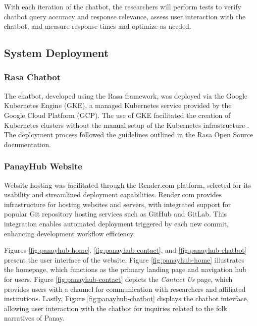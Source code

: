     With each iteration of the chatbot, the researchers will perform tests to verify chatbot query accuracy and response relevance, assess user interaction with the chatbot, and measure response times and optimize as needed.
    
\subsection{System Deployment}
\subsubsection{Rasa Chatbot}
    The chatbot, developed using the Rasa framework, was deployed via the Google Kubernetes Engine (GKE), a managed Kubernetes service provided by the Google Cloud Platform (GCP). The use of GKE facilitated the creation of Kubernetes clusters without the manual setup of the Kubernetes infrastructure \cite{sullivan2023}. The deployment process followed the guidelines outlined in the Rasa Open Source documentation.


\subsubsection{PanayHub Website}
    Website hosting was facilitated through the Render.com platform, selected for its usability and streamlined deployment capabilities. Render.com provides infrastructure for hosting websites and servers, with integrated support for popular Git repository hosting services such as GitHub and GitLab. This integration enables automated deployment triggered by each new commit, enhancing development workflow efficiency.

    Figures \ref{fig:panayhub-home}, \ref{fig:panayhub-contact}, and \ref{fig:panayhub-chatbot} present the user interface of the website. Figure \ref{fig:panayhub-home} illustrates the homepage, which functions as the primary landing page and navigation hub for users. Figure \ref{fig:panayhub-contact} depicts the \textit{Contact Us} page, which provides users with a channel for communication with researchers and affiliated institutions. Lastly, Figure \ref{fig:panayhub-chatbot} displays the chatbot interface, allowing user interaction with the chatbot for inquiries related to the folk narratives of Panay.

